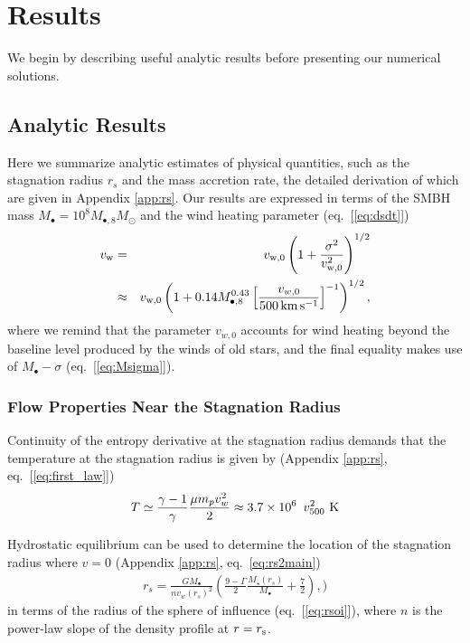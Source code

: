 \documentclass[usenatbib,fleqn]{mn2e}
\newcommand{\rs}{r_s}
\newcommand{\vw}{v_w}
\newcommand{\Mstar}{M_{\star}}
\newcommand{\Mbh}[1][]{M_{\bullet#1}}
\newcommand{\Mbheight}{M_{\bullet,8}}
\newcommand{\vwO}{v_{w,0}}
\begin{document}
\section{Results}

We begin by describing useful analytic results before presenting our numerical solutions.  

\label{sec:results}
\subsection{Analytic Results}

Here we summarize analytic estimates of physical quantities, such as the stagnation radius $\rs$ and the mass accretion rate, the detailed derivation of which are given in Appendix \ref{app:rs}.  Our results are expressed in terms of the SMBH mass $M_{\bullet} = 10^{8}M_{\bullet,8}M_{\odot}$ and the wind heating parameter (eq.~[\ref{eq:dsdt}])
\begin{eqnarray}
v_{\rm w} &=& v_{\rm w,0}\left(1+\frac{\sigma^{2}}{v_{\rm w,0}^{2}}\right)^{1/2}  \nonumber \\
 &\approx& v_{\rm w,0}\left(1+0.14 \Mbheight^{0.43}\left[\frac{v_{w,0}}{500\,\rm km\,s^{-1}}\right]^{-1}\right)^{1/2},
\end{eqnarray}
where we remind that the parameter $\vwO$ accounts for wind heating beyond the baseline level produced by the winds of old stars, and the final equality makes use of $M_{\bullet}-\sigma$ (eq.~[\ref{eq:Msigma}]).

\subsubsection{Flow Properties Near the Stagnation Radius}

Continuity of the entropy derivative at the stagnation radius demands that the temperature at the stagnation radius is given by (Appendix \ref{app:rs}, eq.~[\ref{eq:first_law}])
\begin{align}
T \simeq \frac{\gamma-1}{\gamma}\frac{\mu m_p v_{w}^{2}}{2} \approx 3.7
\times 10^6\ \, v_{500}^2 \,\,{\rm K} 
\label{eq:Tanalytic}
\end{align}

Hydrostatic equilibrium can be used to determine the location of the stagnation radius where $v = 0$ (Appendix \ref{app:rs}, eq.~\ref{eq:rs2main})
\begin{align}
\rs=\frac{G \Mbh}{n \vw(\rs)^2}\left(\frac{9-\Gamma}{2} \frac{\Mstar(\rs)}{\Mbh} +\frac{7}{2}\right),
\label{eq:stag_analytic})
\end{align}
in terms of the radius of the sphere of influence (eq.~[\ref{eq:rsoi}]), where $n$ is the power-law slope of the density profile at $r = r_{\rm s}$.
\end{document}

